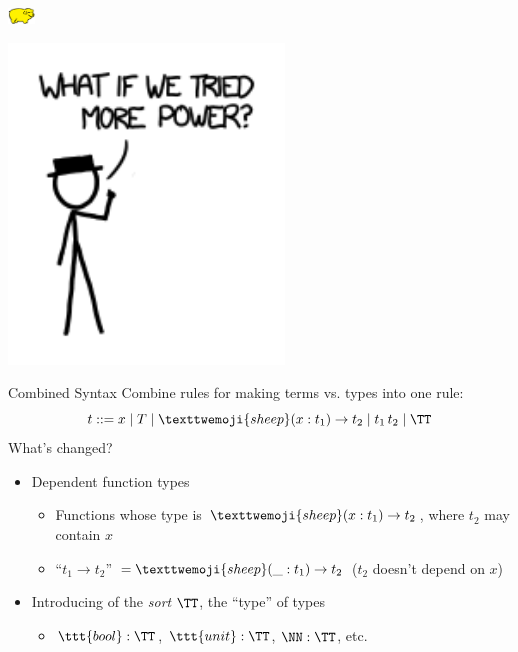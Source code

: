 \documentclass{beamer}
\newcommand{\lamb}{\texttwemoji{sheep}}
\begin{document}
\begin{frame}{\includegraphics[width=20pt]{yellowPig.png}}
 \begin{center}
   \includegraphics[width=0.55\textwidth]{more_power.png} 
 \end{center} 
\end{frame}

\begin{frame}{Combined Syntax}
  Combine rules for making terms vs. types into one rule: 
  \[
  t ::= x \mid T \mid \lamb (x :t_1) \to t_2 \mid t_1 \, t_2 \mid \TT
  \] 
  What's changed? \pause 
  \begin{itemize}
    \item Dependent function types
      \begin{itemize}
        \item Functions whose type is $\lamb (x : t_1) \to t_2$, where $t_2$
          may contain $x$
        \item ``$t_1 \to t_2$'' $= \lamb (\_ : t_1) \to t_2$ ($t_2$ doesn't
          depend on $x$)
      \end{itemize}
    \item Introducing of the \emph{sort} $\TT$, the ``type'' of types
      \begin{itemize}
        \item $\ttt{bool} : \TT$, $\ttt{unit} : \TT$, $\NN : \TT$, etc. 
      \end{itemize}
  \end{itemize}
\end{frame}
\end{document}
